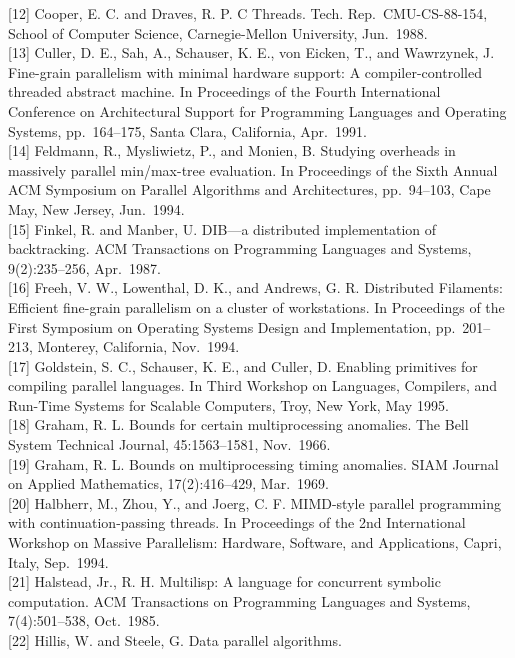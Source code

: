 \documentclass[
]{article}
\begin{document}
{[}12{]} Cooper, E. C. and Draves, R. P. C Threads. Tech.
Rep.~CMU-CS-88-154, School of Computer Science, Carnegie-Mellon
University, Jun.~1988.\\
{[}13{]} Culler, D. E., Sah, A., Schauser, K. E., von Eicken, T., and
Wawrzynek, J. Fine-grain parallelism with minimal hardware support: A
compiler-controlled threaded abstract machine. In Proceedings of the
Fourth International Conference on Architectural Support for Programming
Languages and Operating Systems, pp.~164--175, Santa Clara, California,
Apr.~1991.\\
{[}14{]} Feldmann, R., Mysliwietz, P., and Monien, B. Studying overheads
in massively parallel min/max-tree evaluation. In Proceedings of the
Sixth Annual ACM Symposium on Parallel Algorithms and Architectures,
pp.~94--103, Cape May, New Jersey, Jun.~1994.\\
{[}15{]} Finkel, R. and Manber, U. DIB---a distributed implementation of
backtracking. ACM Transactions on Programming Languages and Systems,
9(2):235--256, Apr.~1987.\\
{[}16{]} Freeh, V. W., Lowenthal, D. K., and Andrews, G. R. Distributed
Filaments: Efficient fine-grain parallelism on a cluster of
workstations. In Proceedings of the First Symposium on Operating Systems
Design and Implementation, pp.~201--213, Monterey, California,
Nov.~1994.\\
{[}17{]} Goldstein, S. C., Schauser, K. E., and Culler, D. Enabling
primitives for compiling parallel languages. In Third Workshop on
Languages, Compilers, and Run-Time Systems for Scalable Computers, Troy,
New York, May 1995.\\
{[}18{]} Graham, R. L. Bounds for certain multiprocessing anomalies. The
Bell System Technical Journal, 45:1563--1581, Nov.~1966.\\
{[}19{]} Graham, R. L. Bounds on multiprocessing timing anomalies. SIAM
Journal on Applied Mathematics, 17(2):416--429, Mar.~1969.\\
{[}20{]} Halbherr, M., Zhou, Y., and Joerg, C. F. MIMD-style parallel
programming with continuation-passing threads. In Proceedings of the 2nd
International Workshop on Massive Parallelism: Hardware, Software, and
Applications, Capri, Italy, Sep.~1994.\\
{[}21{]} Halstead, Jr., R. H. Multilisp: A language for concurrent
symbolic computation. ACM Transactions on Programming Languages and
Systems, 7(4):501--538, Oct.~1985.\\
{[}22{]} Hillis, W. and Steele, G. Data parallel algorithms.
\end{document}

